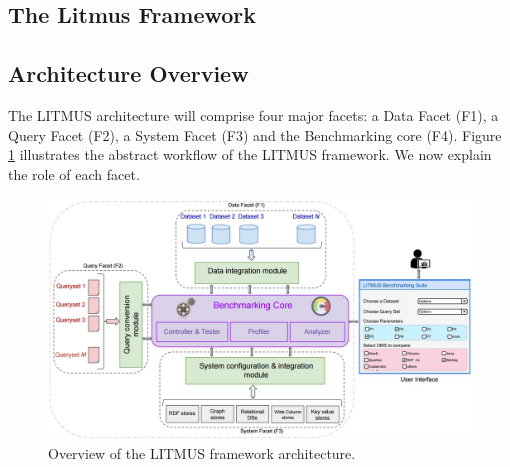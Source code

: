 \documentclass{llncs}
\newcommand{\todoinline}[1]{
    \todo[inline]{#1}
}
\begin{document}
\begin{itemize}[nosep]
\section{The Litmus Framework}\label{litmus_framework}
        

    \subsection{Architecture Overview}
        The LITMUS architecture will comprise four major facets: a Data Facet (F1), a Query Facet (F2), a System Facet (F3) and the Benchmarking core (F4). Figure \ref{fig:benchmark_arch} illustrates the abstract workflow of the LITMUS framework. We now explain the role of each facet. 
         
        \begin{figure}[h]
            \centering
            \includegraphics[scale=0.18]{images/benchmark_arch_latest_new}
            \caption{Overview of the LITMUS framework architecture.}
            \label{fig:benchmark_arch}
        \end{figure}
        

\end{itemize}
\end{document}
